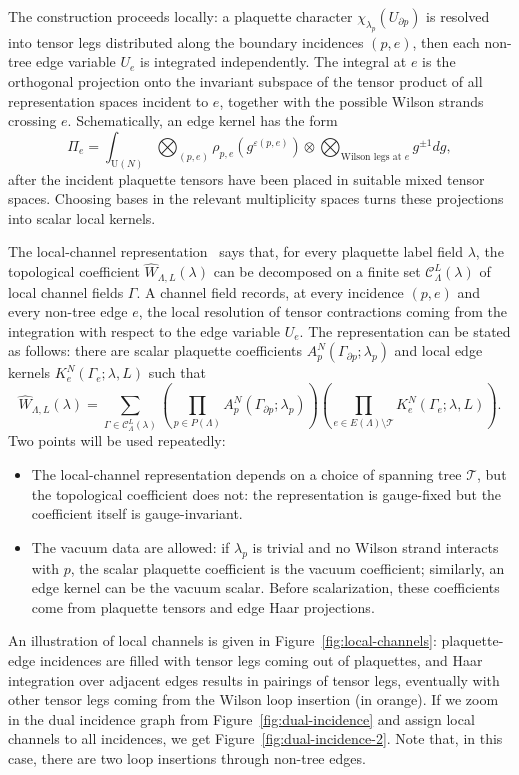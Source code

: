 \documentclass[11pt,a4paper,reqno]{amsart}
\theoremstyle{definition}
\theoremstyle{remark}
\newcommand\U{{\mathrm U}}
\begin{document}
The construction proceeds locally: a plaquette character $\chi_{\lambda_p}(U_{\partial p})$ is resolved into tensor legs distributed along the boundary incidences $(p,e)$, then each non-tree edge variable $U_e$ is integrated independently.  The integral at $e$ is the orthogonal projection onto the invariant subspace of the tensor product of all representation spaces incident to $e$, together with the possible Wilson strands crossing $e$.  Schematically, an edge kernel has the form
\[
\Pi_e
=\int_{\U(N)}
\bigotimes_{(p,e)}\rho_{p,e}(g^{\varepsilon(p,e)})
\otimes
\bigotimes_{\text{Wilson legs at }e} g^{\pm1} dg,
\]
after the incident plaquette tensors have been placed in suitable mixed tensor spaces.  Choosing bases in the relevant multiplicity spaces turns these projections into scalar local kernels.

The local-channel representation~\cite[Theorem~1.3]{Lem26a} says that, for every plaquette label field $\lambda$, the topological coefficient $\widehat{W}_{\Lambda,L}(\lambda)$ can be decomposed on a finite set $\mathcal C_\Lambda^L(\lambda)$ of local channel fields $\Gamma$.  A channel field records, at every incidence $(p,e)$ and every non-tree edge $e$, the local resolution of tensor contractions coming from the integration with respect to the edge variable $U_e$. The representation can be stated as follows: there are scalar plaquette coefficients $A_p^N(\Gamma_{\partial p};\lambda_p)$ and local edge kernels $K_e^N(\Gamma_e;\lambda,L)$ such that
\begin{equation}\label{eq:local-channel}
\widehat W_{\Lambda,L}(\lambda)=\sum_{\Gamma\in\mathcal C^L_\Lambda(\lambda)}\left(\prod_{p\in P(\Lambda)}A_p^N(\Gamma_{\partial p};\lambda_p)\right)\left(\prod_{e\in E(\Lambda)\setminus\mathcal T}K^N_e(\Gamma_e;\lambda,L)\right).
\end{equation}
Two points will be used repeatedly:
\begin{itemize}
\item The local-channel representation depends on a choice of spanning tree $\mathcal T$, but the topological coefficient does not: the representation is gauge-fixed but the coefficient itself is gauge-invariant.
\item The vacuum data are allowed: if $\lambda_p$ is trivial and no Wilson strand interacts with $p$, the scalar plaquette coefficient is the vacuum coefficient; similarly, an edge kernel can be the vacuum scalar. Before scalarization, these coefficients come from plaquette tensors and edge Haar projections.
\end{itemize}
An illustration of local channels is given in Figure~\ref{fig:local-channels}: plaquette-edge incidences are filled with tensor legs coming out of plaquettes, and Haar integration over adjacent edges results in pairings of tensor legs, eventually with other tensor legs coming from the Wilson loop insertion (in orange). If we zoom in the dual incidence graph from Figure~\ref{fig:dual-incidence} and assign local channels to all incidences, we get Figure~\ref{fig:dual-incidence-2}. Note that, in this case, there are two loop insertions through non-tree edges.
\end{document}
